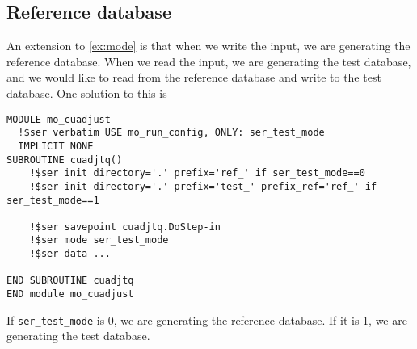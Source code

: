 \documentclass{article}
\begin{document}
\subsection{Reference database}
An extension to \ref{ex:mode} is that when we write the input, we are generating the reference database. When we read the input, we are generating the test database, and we would like to read from the reference database and write to the test database. One solution to this is
\begin{lstlisting}
MODULE mo_cuadjust
  !$ser verbatim USE mo_run_config, ONLY: ser_test_mode
  IMPLICIT NONE
SUBROUTINE cuadjtq()
    !$ser init directory='.' prefix='ref_' if ser_test_mode==0
    !$ser init directory='.' prefix='test_' prefix_ref='ref_' if ser_test_mode==1

    !$ser savepoint cuadjtq.DoStep-in
    !$ser mode ser_test_mode
    !$ser data ...

END SUBROUTINE cuadjtq
END module mo_cuadjust
\end{lstlisting}

If \texttt{ser\_test\_mode} is 0, we are generating the reference database. If it is 1, we are generating the test database.
\end{document}
